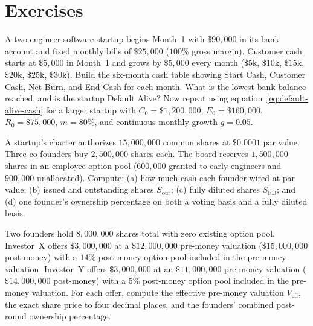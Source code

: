 \section*{Exercises}

\begin{exercise}
A two-engineer software startup begins Month~1 with $\$90{,}000$ in its bank account and fixed monthly bills of $\$25{,}000$ ($100\%$ gross margin). Customer cash starts at $\$5{,}000$ in Month~1 and grows by $\$5{,}000$ every month ($\$5\text{k}$, $\$10\text{k}$, $\$15\text{k}$, $\$20\text{k}$, $\$25\text{k}$, $\$30\text{k}$). Build the six-month cash table showing Start Cash, Customer Cash, Net Burn, and End Cash for each month. What is the lowest bank balance reached, and is the startup Default Alive? Now repeat using equation~\eqref{eq:default-alive-cash} for a larger startup with $C_0 = \$1{,}200{,}000$, $E_0 = \$160{,}000$, $R_0 = \$75{,}000$, $m = 80\%$, and continuous monthly growth $g = 0.05$.
\end{exercise}

\begin{exercise}
A startup's charter authorizes $15{,}000{,}000$ common shares at $\$0.0001$ par value. Three co-founders buy $2{,}500{,}000$ shares each. The board reserves $1{,}500{,}000$ shares in an employee option pool ($600{,}000$ granted to early engineers and $900{,}000$ unallocated). Compute: (a) how much cash each founder wired at par value; (b) issued and outstanding shares $S_{\text{out}}$; (c) fully diluted shares $S_{\text{FD}}$; and (d) one founder's ownership percentage on both a voting basis and a fully diluted basis.
\end{exercise}

\begin{exercise}
Two founders hold $8{,}000{,}000$ shares total with zero existing option pool. Investor~X offers $\$3{,}000{,}000$ at a $\$12{,}000{,}000$ pre-money valuation ($\$15{,}000{,}000$ post-money) with a $14\%$ post-money option pool included in the pre-money valuation. Investor~Y offers $\$3{,}000{,}000$ at an $\$11{,}000{,}000$ pre-money valuation ($\$14{,}000{,}000$ post-money) with a $5\%$ post-money option pool included in the pre-money valuation. For each offer, compute the effective pre-money valuation $V_{\text{eff}}$, the exact share price to four decimal places, and the founders' combined post-round ownership percentage.
\end{exercise}

